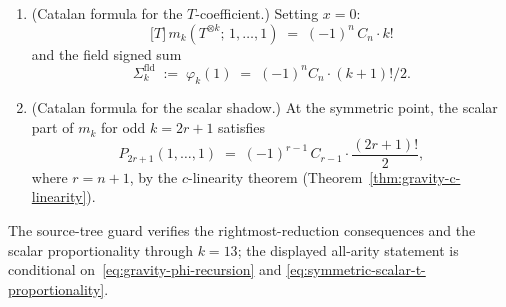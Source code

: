 \begin{theorem}
\begin{enumerate}[label=\textup{(\roman*)}]
 with roots $\{-2, -3, \ldots, -k\}$, and every depth
 $d \in \{0, 1, \ldots, k-1\}$ is populated with nonzero
 coefficient.
\item \textup{(Catalan formula for the $T$-coefficient.)}
 Setting $x = 0$:
 \begin{equation}\label{eq:symmetric-catalan-T}
 \bigl[T\bigr]\,m_k(T^{\otimes k};\,1,\ldots,1)
 \;=\;
 (-1)^n\,C_n\cdot k!
 \end{equation}
 and the field signed sum
 \[
 \Sigma_k^{\mathrm{fld}}
 \;:=\;
 \varphi_k(1)
 \;=\;
 (-1)^n C_n \cdot (k{+}1)!/2 .
 \]
\item \textup{(Catalan formula for the scalar shadow.)}
 At the symmetric point, the scalar part of $m_k$ for odd
 $k = 2r{+}1$ satisfies
 \begin{equation}\label{eq:symmetric-catalan}
 P_{2r+1}(1,\ldots,1)
 \;=\;
 (-1)^{r-1}\, C_{r-1} \cdot \frac{(2r+1)!}{2},
 \end{equation}
 where $r = n{+}1$, by the $c$-linearity theorem
 \textup{(}Theorem~\textup{\ref{thm:gravity-c-linearity})}.
\end{enumerate}
The source-tree guard verifies the rightmost-reduction consequences and
the scalar proportionality through $k = 13$; the displayed all-arity
statement is conditional on~\eqref{eq:gravity-phi-recursion} and
\eqref{eq:symmetric-scalar-t-proportionality}.
\end{theorem}

